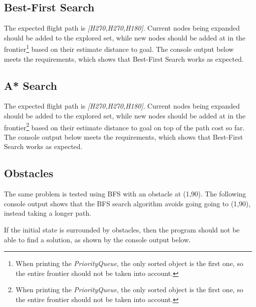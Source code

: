 \documentclass[letterpaper,12pt]{article}
\begin{document}
\subsection{Best-First Search}

The expected flight path is \textit{[H270,H270,H180]}. Current nodes being expanded should be added to the explored set, while new nodes should be added at in the frontier\footnote{When printing the \textit{PriorityQueue}, the only sorted object is the first one, so the entire frontier should not be taken into account.} based on their estimate distance to goal. The console output below meets the requirements, which shows that Best-First Search works as expected.



\subsection{A* Search}

The expected flight path is \textit{[H270,H270,H180]}. Current nodes being expanded should be added to the explored set, while new nodes should be added at in the frontier\footnote{When printing the \textit{PriorityQueue}, the only sorted object is the first one, so the entire frontier should not be taken into account.} based on their estimate distance to goal on top of the path cost so far. The console output below meets the requirements, which shows that Best-First Search works as expected.



\subsection{Obstacles}

The same problem is tested using BFS with an obstacle at (1,90). The following console output shows that the BFS search algorithm avoids going going to (1,90), instead taking a longer path.



If the initial state is surrounded by obstacles, then the program should not be able to find a solution, as shown by the console output below.


\end{document}
